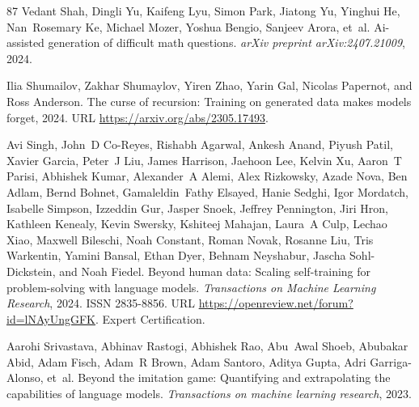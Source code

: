 \begin{thebibliography}{87}
Vedant Shah, Dingli Yu, Kaifeng Lyu, Simon Park, Jiatong Yu, Yinghui He, Nan~Rosemary Ke, Michael Mozer, Yoshua Bengio, Sanjeev Arora, et~al.
\newblock Ai-assisted generation of difficult math questions.
\newblock \emph{arXiv preprint arXiv:2407.21009}, 2024.

Ilia Shumailov, Zakhar Shumaylov, Yiren Zhao, Yarin Gal, Nicolas Papernot, and Ross Anderson.
\newblock The curse of recursion: Training on generated data makes models forget, 2024.
\newblock URL \url{https://arxiv.org/abs/2305.17493}.

Avi Singh, John~D Co-Reyes, Rishabh Agarwal, Ankesh Anand, Piyush Patil, Xavier Garcia, Peter~J Liu, James Harrison, Jaehoon Lee, Kelvin Xu, Aaron~T Parisi, Abhishek Kumar, Alexander~A Alemi, Alex Rizkowsky, Azade Nova, Ben Adlam, Bernd Bohnet, Gamaleldin~Fathy Elsayed, Hanie Sedghi, Igor Mordatch, Isabelle Simpson, Izzeddin Gur, Jasper Snoek, Jeffrey Pennington, Jiri Hron, Kathleen Kenealy, Kevin Swersky, Kshiteej Mahajan, Laura~A Culp, Lechao Xiao, Maxwell Bileschi, Noah Constant, Roman Novak, Rosanne Liu, Tris Warkentin, Yamini Bansal, Ethan Dyer, Behnam Neyshabur, Jascha Sohl-Dickstein, and Noah Fiedel.
\newblock Beyond human data: Scaling self-training for problem-solving with language models.
\newblock \emph{Transactions on Machine Learning Research}, 2024.
\newblock ISSN 2835-8856.
\newblock URL \url{https://openreview.net/forum?id=lNAyUngGFK}.
\newblock Expert Certification.

Aarohi Srivastava, Abhinav Rastogi, Abhishek Rao, Abu~Awal Shoeb, Abubakar Abid, Adam Fisch, Adam~R Brown, Adam Santoro, Aditya Gupta, Adri Garriga-Alonso, et~al.
\newblock Beyond the imitation game: Quantifying and extrapolating the capabilities of language models.
\newblock \emph{Transactions on machine learning research}, 2023.


\end{thebibliography}
